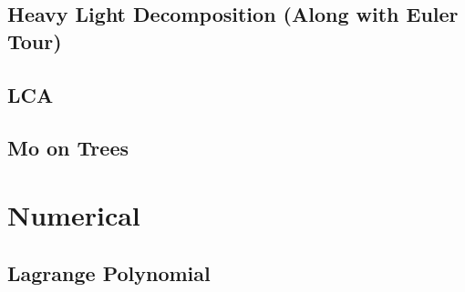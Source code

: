 \subsection{Heavy Light Decomposition (Along with Euler Tour)}
\raggedbottom
\hrulefill
\subsection{LCA}
\raggedbottom
\hrulefill
\subsection{Mo on Trees}
\raggedbottom
\hrulefill

\section{Numerical}
\subsection{Lagrange Polynomial}
\raggedbottom
\hrulefill

